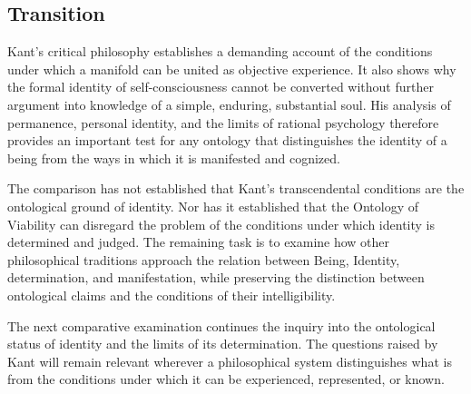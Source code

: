 
\subsection{Transition}
\label{subsec:ch08-kant-transition}

\label{para:VS.B01.P01.C08.S10.SS15.P001}

Kant's critical philosophy establishes
a demanding account of the conditions
under which a manifold can be united
as objective experience. It also
shows why the formal identity of
self-consciousness cannot be converted
without further argument into knowledge
of a simple, enduring, substantial soul.
His analysis of permanence, personal
identity, and the limits of rational
psychology therefore provides an
important test for any ontology that
distinguishes the identity of a being
from the ways in which it is manifested
and cognized.

\label{para:VS.B01.P01.C08.S10.SS15.P002}

The comparison has not established
that Kant's transcendental conditions
are the ontological ground of identity.
Nor has it established that the
Ontology of Viability can disregard
the problem of the conditions under
which identity is determined and
judged. The remaining task is to
examine how other philosophical
traditions approach the relation
between Being, Identity, determination,
and manifestation, while preserving
the distinction between ontological
claims and the conditions of their
intelligibility.

\label{para:VS.B01.P01.C08.S10.SS15.P003}

The next comparative examination
continues the inquiry into the
ontological status of identity and
the limits of its determination.
The questions raised by Kant will
remain relevant wherever a philosophical
system distinguishes what is from
the conditions under which it can
be experienced, represented, or known.


